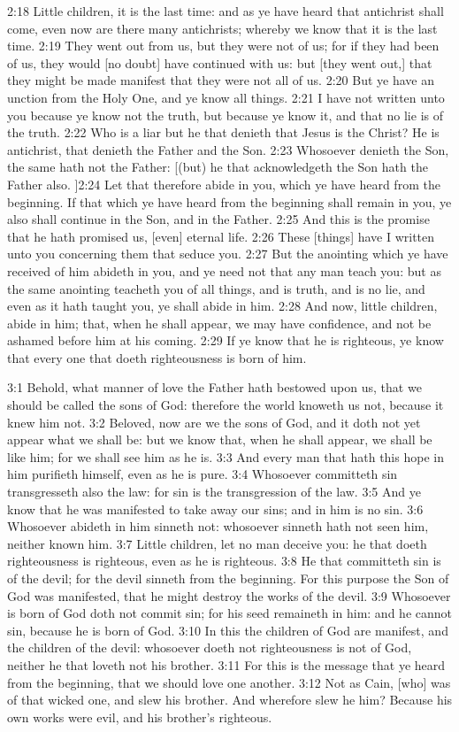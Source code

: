    {2:18} Little children, it is the last time: and as ye have heard
that antichrist shall come, even now are there many antichrists;
whereby we know that it is the last time. {2:19} They went out from us,
but they were not of us; for if they had been of us, they would [no
doubt] have continued with us: but [they went out,] that they might be
made manifest that they were not all of us. {2:20} But ye have an
unction from the Holy One, and ye know all things. {2:21} I have not
written unto you because ye know not the truth, but because ye know it,
and that no lie is of the truth. {2:22} Who is a liar but he that
denieth that Jesus is the Christ? He is antichrist, that denieth the
Father and the Son. {2:23} Whosoever denieth the Son, the same hath not
the Father: [(but) he that acknowledgeth the Son hath the Father also.
]{2:24} Let that therefore abide in you, which ye have heard from the
beginning. If that which ye have heard from the beginning shall remain
in you, ye also shall continue in the Son, and in the Father. {2:25}
And this is the promise that he hath promised us, [even] eternal life.
{2:26} These [things] have I written unto you concerning them that
seduce you. {2:27} But the anointing which ye have received of him
abideth in you, and ye need not that any man teach you: but as the same
anointing teacheth you of all things, and is truth, and is no lie, and
even as it hath taught you, ye shall abide in him. {2:28} And now,
little children, abide in him; that, when he shall appear, we may have
confidence, and not be ashamed before him at his coming. {2:29} If ye
know that he is righteous, ye know that every one that doeth
righteousness is born of him.

   {3:1} Behold, what manner of love the Father hath bestowed upon us,
that we should be called the sons of God: therefore the world knoweth
us not, because it knew him not. {3:2} Beloved, now are we the sons of
God, and it doth not yet appear what we shall be: but we know that,
when he shall appear, we shall be like him; for we shall see him as he
is. {3:3} And every man that hath this hope in him purifieth himself,
even as he is pure. {3:4} Whosoever committeth sin transgresseth also
the law: for sin is the transgression of the law. {3:5} And ye know
that he was manifested to take away our sins; and in him is no sin.
{3:6} Whosoever abideth in him sinneth not: whosoever sinneth hath not
seen him, neither known him. {3:7} Little children, let no man deceive
you: he that doeth righteousness is righteous, even as he is righteous.
{3:8} He that committeth sin is of the devil; for the devil sinneth
from the beginning. For this purpose the Son of God was manifested,
that he might destroy the works of the devil. {3:9} Whosoever is born
of God doth not commit sin; for his seed remaineth in him: and he
cannot sin, because he is born of God. {3:10} In this the children of
God are manifest, and the children of the devil: whosoever doeth not
righteousness is not of God, neither he that loveth not his brother.
{3:11} For this is the message that ye heard from the beginning, that
we should love one another. {3:12} Not as Cain, [who] was of that
wicked one, and slew his brother. And wherefore slew he him? Because
his own works were evil, and his brother's righteous.


